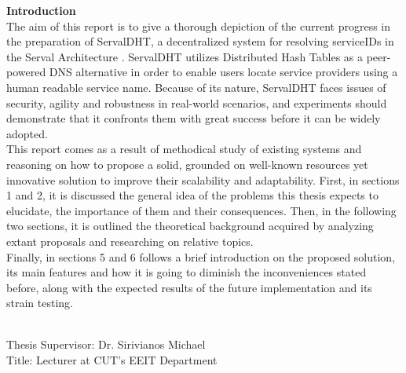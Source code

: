 \documentclass[12pt,a4paper,oneside]{article}
\begin{document}
{\Large \bf \noindent Introduction} \\[0.5cm]
The aim of this report is to give a thorough depiction of the current progress in the preparation of ServalDHT, a decentralized system for resolving serviceIDs in the Serval Architecture \cite{Nordstrom2012}.
ServalDHT utilizes Distributed Hash Tables  as a peer-powered DNS   alternative in order to enable users locate service providers using a human readable service name.
Because of its nature, ServalDHT faces issues of security, agility and robustness in real-world scenarios, and experiments should demonstrate that it confronts them with great success before it can be widely adopted.\\
\indent This report comes as a result of methodical study of existing systems and reasoning on how to propose a solid, grounded on well-known resources yet innovative solution to improve their scalability and adaptability.
First, in sections 1 and 2, it is discussed the general idea of the problems this thesis expects to elucidate, the importance of them and their consequences.
Then, in the following two sections, it is outlined the theoretical background acquired by analyzing extant proposals and researching on relative topics.\\
\indent Finally, in sections 5 and 6 follows a brief introduction on the proposed solution, its main features and how it is going to diminish the inconveniences stated before, along with the expected results of the future implementation and its strain testing.

~\\[0.5cm]
{\large
\noindent Thesis Supervisor: Dr. Sirivianos Michael\\
\noindent Title: Lecturer at CUT's EEIT Department}

\end{document}
